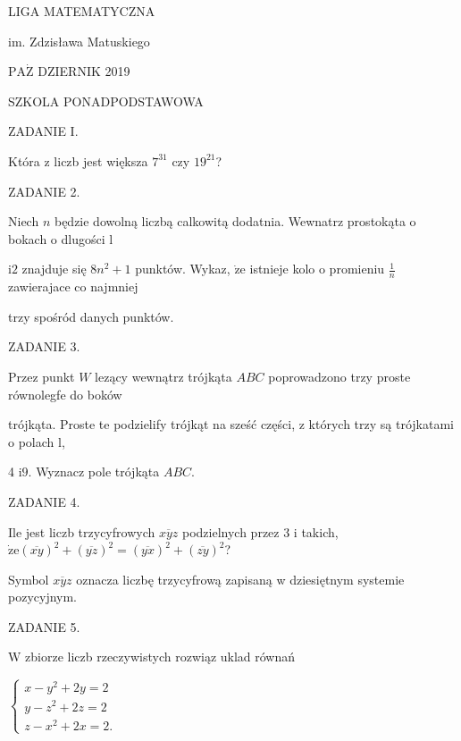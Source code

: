 \documentclass[a4paper,12pt]{article}
\begin{document}
LIGA MATEMATYCZNA

im. Zdzisława Matuskiego

$\mathrm{P}\mathrm{A}\dot{\mathrm{Z}}$ DZIERNIK 2019

SZKOLA PONADPODSTAWOWA

ZADANIE I.

Która z liczb jest większa $7^{31}$ czy $19^{21}$?

ZADANIE 2.

Niech $n$ będzie dowolną liczbą calkowitą dodatnia. Wewnatrz prostokąta o bokach o dlugości l

$\mathrm{i}2$ znajduje się $8n^{2}+1$ punktów. Wykaz, $\dot{\mathrm{z}}\mathrm{e}$ istnieje kolo o promieniu $\displaystyle \frac{1}{n}$ zawierajace co najmniej

trzy spośród danych punktów.

ZADANIE 3.

Przez punkt $W$ lezący wewnątrz trójkąta $ABC$ poprowadzono trzy proste równolegfe do boków

trójkąta. Proste te podzielify trójkąt na sześć części, z których trzy są trójkatami o polach l,

4 $\mathrm{i}9$. Wyznacz pole trójkąta $ABC.$

ZADANIE 4.

Ile jest liczb trzycyfrowych $\overline{xyz}$ podzielnych przez 3 i takich, $\dot{\mathrm{z}}\mathrm{e}(\overline{xy})^{2}+(\overline{yz})^{2}=(\overline{yx})^{2}+(\overline{zy})^{2}$?

Symbol $\overline{xyz}$ oznacza liczbę trzycyfrową zapisaną w dziesiętnym systemie pozycyjnym.

ZADANIE 5.

$\mathrm{W}$ zbiorze liczb rzeczywistych rozwiąz uklad równań

$\left\{\begin{array}{l}
x-y^{2}+2y=2\\
y-z^{2}+2z=2\\
z-x^{2}+2x=2.
\end{array}\right.$
\end{document}
